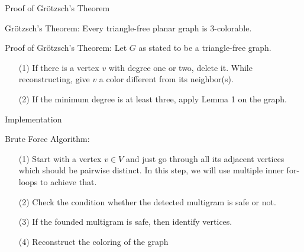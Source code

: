 \documentclass{beamer}
\begin{document}
\begin{frame}{Proof of Grötzsch's Theorem}
    \begin{block}{Grötzsch's Theorem:}
    Every triangle-free planar graph is 3-colorable.
    \end{block}
    
    \begin{block}{Proof of Grötzsch's Theorem:}
    Let $G$ as stated to be a triangle-free graph.\\
    \begin{itemize}
        \item[(1)] If there is a vertex $v$ with degree one or two, delete it. While reconstructing, give $v$ a color different from its neighbor(s).
        \item[(2)] If the minimum degree is at least three, apply Lemma 1 on the graph.
    \end{itemize}



    \end{block}
\end{frame}

\begin{frame}{Implementation}
    \begin{block}{Brute Force Algorithm:}
\begin{itemize}
    \item[(1)] Start with a vertex $v \in V$ and just go through all its adjacent vertices which should be pairwise distinct. In this step, we will use multiple inner for-loops to achieve that.
    \item[(2)] Check the condition whether the detected multigram is safe or not.
    \item[(3)] If the founded multigram is safe, then identify vertices.
    \item[(4)] Reconstruct the coloring of the graph
\end{itemize}

    \end{block}
\end{frame}
\end{document}
